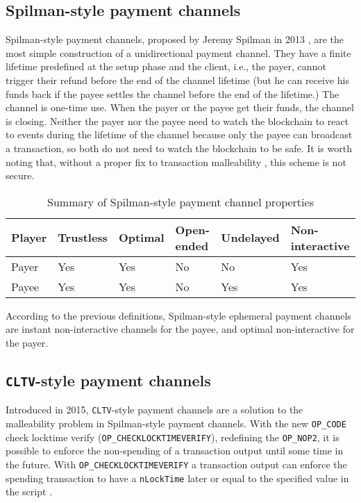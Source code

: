 \subsection{Spilman-style payment channels}

Spilman-style payment channels, proposed by Jeremy Spilman in 2013
\cite{SpilmanStyle}, are the most simple construction of a unidirectional
payment channel. They have a finite lifetime predefined at the setup phase and
the client, i.e., the payer, cannot trigger their refund before the end of the
channel lifetime (but he can receive his funds back if the payee settles the
channel before the end of the lifetime.) The channel is one-time use. When the
payer or the payee get their funds, the channel is closing. Neither the payer nor the
payee need to watch the blockchain to react to events during the lifetime of
the channel because only the payee can broadcast a transaction, so both do not
need to watch the blockchain to be safe. It is worth noting that, without a
proper fix to transaction malleability \cite{SegWitBIP, BIP62,
DBLP:journals/corr/AndrychowiczDMM13, DBLP:journals/corr/DeckerW14}, this scheme
is not secure.

\begin{table}[h]
  \begin{tabularx}{\textwidth}{ | X | l | l | l | l | l |}
  \hline
  Player & Trustless & Optimal & Open-ended & Undelayed & Non-interactive \\ \hline \hline
  Payer & Yes & Yes & No & No & Yes \\ \hline
  Payee & Yes & Yes & No & Yes & Yes \\
  \hline
  \end{tabularx}
  \caption{Summary of Spilman-style payment channel properties}
  \label{fig:summarySpilmanPaymentChannel}
\end{table}

According to the previous definitions, Spilman-style ephemeral payment channels are
instant non-interactive channels for the payee, and optimal non-interactive for
the payer.

\subsection{\texttt{CLTV}-style payment channels}

Introduced in 2015, \texttt{CLTV}-style payment channels are a solution to the malleability
problem in Spilman-style payment channels. With the new \texttt{OP\_CODE} check
locktime verify (\texttt{OP\_CHECKLOCKTIMEVERIFY}), redefining the
\texttt{OP\_NOP2}, it is possible to enforce the non-spending of a transaction
output until some time in the future. With \texttt{OP\_CHECKLOCKTIMEVERIFY} a
transaction output can enforce the spending transaction to have a
\texttt{nLockTime} later or equal to the specified value in the script
\cite{BIP65}.

